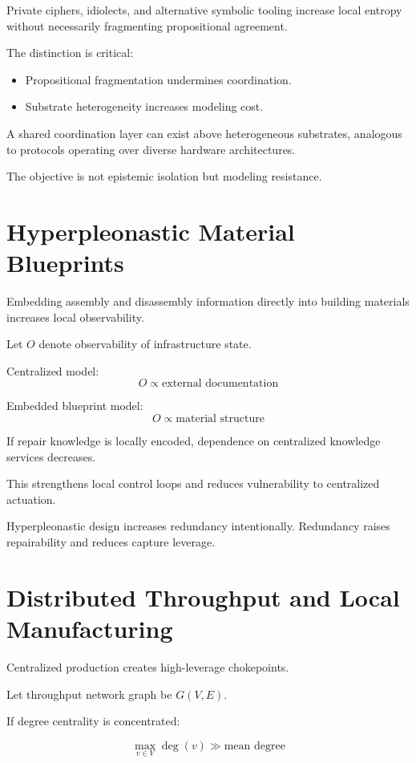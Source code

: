 \documentclass[12pt]{article}
\begin{document}
Private ciphers, idiolects, and alternative symbolic tooling increase local entropy without necessarily fragmenting propositional agreement.

The distinction is critical:

\begin{itemize}
\item Propositional fragmentation undermines coordination.
\item Substrate heterogeneity increases modeling cost.
\end{itemize}

A shared coordination layer can exist above heterogeneous substrates, analogous to protocols operating over diverse hardware architectures.

The objective is not epistemic isolation but modeling resistance.

\section{Hyperpleonastic Material Blueprints}

Embedding assembly and disassembly information directly into building materials increases local observability.

Let $O$ denote observability of infrastructure state.

Centralized model:
\[
O \propto \text{external documentation}
\]

Embedded blueprint model:
\[
O \propto \text{material structure}
\]

If repair knowledge is locally encoded, dependence on centralized knowledge services decreases.

This strengthens local control loops and reduces vulnerability to centralized actuation.

Hyperpleonastic design increases redundancy intentionally. Redundancy raises repairability and reduces capture leverage.

\section{Distributed Throughput and Local Manufacturing}

Centralized production creates high-leverage chokepoints.

Let throughput network graph be $G(V,E)$.

If degree centrality is concentrated:

\[
\max_{v \in V} \deg(v) \gg \text{mean degree}
\]
\end{document}
